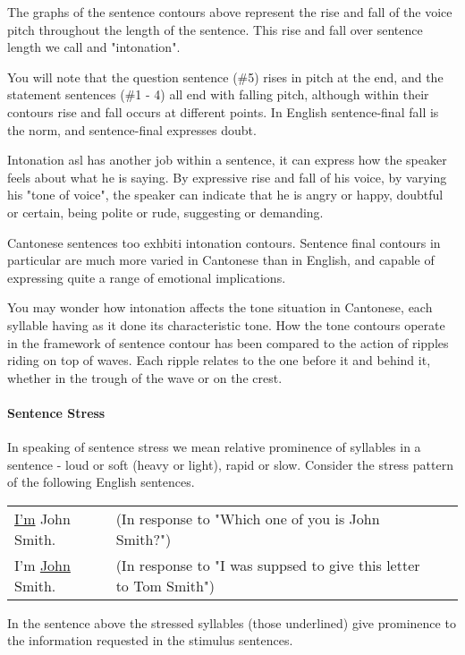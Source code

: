 The graphs of the sentence contours above represent the rise and fall of the voice pitch throughout the length of the sentence. This rise and fall over sentence length we call and "intonation".

You will note that the question sentence (\#5) rises in pitch at the end, and the statement sentences (\#1 - 4) all end with falling pitch, although within their contours rise and fall occurs at different points. In English sentence-final fall is the norm, and sentence-final expresses doubt.

Intonation asl has another job within a sentence, it can express how the speaker feels about what he is saying. By expressive rise and fall of his voice, by varying his "tone of voice", the speaker can indicate that he is angry or happy, doubtful or certain, being polite or rude, suggesting or demanding.

Cantonese sentences too exhbiti intonation contours. Sentence final contours in particular are much more varied in Cantonese than in English, and capable of expressing quite a range of emotional implications.

You may wonder how intonation affects the tone situation in Cantonese, each syllable having as it done its characteristic tone. How the tone contours operate in the framework of sentence contour has been compared to the action of ripples riding on top of waves. Each ripple relates to the one before it and behind it, whether in the trough of the wave or on the crest.

\paragraph{Sentence Stress}

In speaking of sentence stress we mean relative prominence of syllables in a sentence - loud or soft (heavy or light), rapid or slow. Consider the stress pattern of the following English sentences.

\begin{tabularx}{\linewidth}{X X X}
\underline{I'm} John Smith. & (In response to "Which one of you is John Smith?") \\
I'm \underline{John} Smith. & (In response to "I was suppsed to give this letter to Tom Smith") \\
\end{tabularx}

In the sentence above the stressed syllables (those underlined) give prominence to the information requested in the stimulus sentences.

